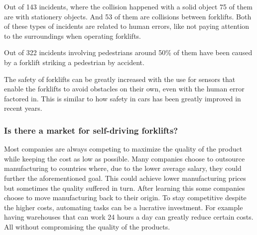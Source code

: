 \documentclass[../report.tex]{subfiles}
\begin{document}
    Out of 143 incidents, where the collision happened with a solid object
    75 of them are with stationery objects. And 53 of them are collisions 
    between forklifts. Both of these types of incidents are related to 
    human errors, like not paying attention to the surroundings when 
    operating forklifts.

    Out of 322 incidents involving pedestrians around 50\% of them have 
    been caused by a forklift striking a pedestrian by accident.

    The safety of forklifts can be greatly increased with the use for sensors that
    enable the forklifts to avoid obstacles on their own, even with the human 
    error factored in. This is similar to how safety in cars has been greatly
    improved in recent years.

    \subsubsection{Is there a market for self-driving forklifts?}
    Most companies are always competing to maximize the quality of the product 
    while keeping the cost as low as possible. Many companies choose
    to outsource manufacturing to countries where, due to the lower
    average salary, they could further the aforementioned goal.
    This could achieve lower manufacturing prices but sometimes 
    the quality suffered in turn. After learning this some companies
    choose to move manufacturing back to their origin. To stay
    competitive despite the higher costs, automating tasks can be
    a lucrative investment. For example having warehouses that can
    work 24 hours a day can greatly reduce certain costs. All without
    compromising the quality of the products.
\end{document}
